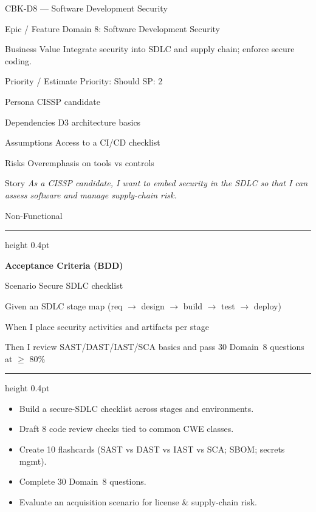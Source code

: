 \documentclass[11pt,a4paper]{article}
\providecommand{\square}{\fbox{\rule{0pt}{0.85ex}\rule{0.85ex}{0pt}}}%
\newcommand{\citem}{\item[$\square$]}
\newcommand{\Tag}[1]{\tcbox[on line, colback=PillBack, colframe=PillBack,
  coltext=PillText, boxrule=0pt, arc=2mm, left=2pt, right=2pt, top=1pt, bottom=1pt]{\small #1}}
\newcommand{\ThinRule}{\par\vspace{4pt}\hrule height 0.4pt\par\vspace{4pt}}
\begin{document}
\clearpage
\begin{StoryCardBox}{CBK-D8 --- Software Development Security}
\begin{metadesc}
\item[Epic / Feature] Domain 8: Software Development Security
\item[Business Value] Integrate security into SDLC and supply chain; enforce secure coding.
\item[Priority / Estimate] Priority: Should \quad SP: 2
\item[Persona] CISSP candidate
\item[Dependencies] D3 architecture basics
\item[Assumptions] Access to a CI/CD checklist
\item[Risks] Overemphasis on tools vs controls
\item[Story] \textit{As a CISSP candidate, I want to embed security in the SDLC so that I can assess software and manage supply-chain risk.}
\item[Non-Functional] \Tag{Security} \Tag{Reliability}
\end{metadesc}

\ThinRule
\textbf{Acceptance Criteria (BDD)}
\begin{metadesc}
\item[Scenario] Secure SDLC checklist
\item[Given] an SDLC stage map (req $\rightarrow$ design $\rightarrow$ build $\rightarrow$ test $\rightarrow$ deploy)
\item[When] I place security activities and artifacts per stage
\item[Then] I review SAST/DAST/IAST/SCA basics and pass 30 Domain~8 questions at $\geq$ 80\%
\end{metadesc}

\ThinRule
\begin{TasksBox}
\begin{itemize}
  \citem Build a secure-SDLC checklist across stages and environments.
  \citem Draft 8 code review checks tied to common CWE classes.
  \citem Create 10 flashcards (SAST vs DAST vs IAST vs SCA; SBOM; secrets mgmt).
  \citem Complete 30 Domain~8 questions.
  \citem Evaluate an acquisition scenario for license \& supply-chain risk.
\end{itemize}
\end{TasksBox}
\end{StoryCardBox}
\end{document}

